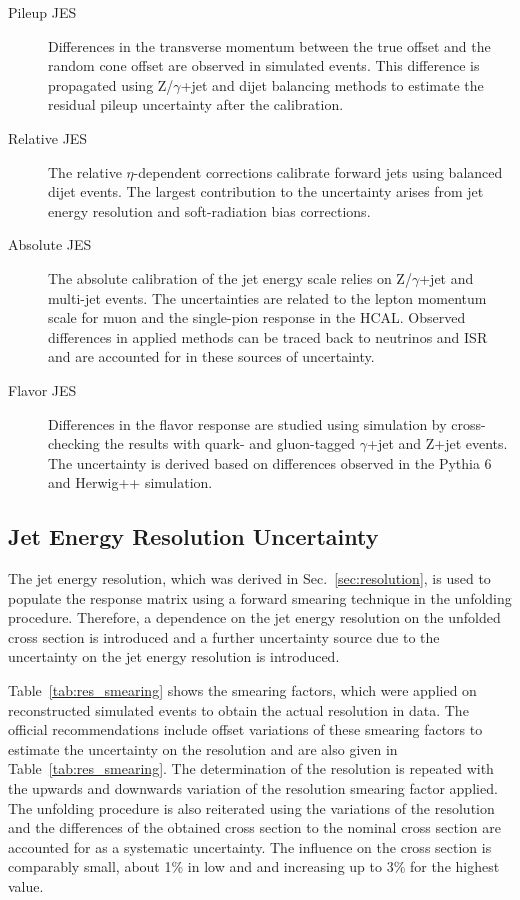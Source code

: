 \begin{description}
    \item[Pileup JES] Differences in the transverse momentum between the true
        offset and the random cone offset are observed in simulated events. This
        difference is propagated using Z/$\gamma$+jet and dijet balancing
        methods to estimate the residual pileup uncertainty after the
        calibration.
    \item[Relative JES] The relative $\eta$-dependent corrections calibrate
        forward jets using balanced dijet events. The largest contribution to
        the uncertainty arises from jet energy resolution and soft-radiation
        bias corrections. 
    \item[Absolute JES]  The absolute calibration of the jet energy scale relies
        on Z/$\gamma$+jet and multi-jet events. The uncertainties are related to
        the lepton momentum scale for muon and the single-pion response in the
        HCAL. Observed differences in applied methods can be traced back to neutrinos
        and ISR and are accounted for in these sources of uncertainty.
    \item[Flavor JES] Differences in the flavor response are studied using
        simulation by cross-checking the results with quark- and gluon-tagged
        $\gamma$+jet and Z+jet events. The uncertainty is derived based on
        differences observed in the Pythia 6 and Herwig++ simulation.
\end{description}

\subsection{Jet Energy Resolution Uncertainty}

The jet energy resolution, which was derived in Sec.~\ref{sec:resolution}, is
used to populate the response matrix using a forward smearing technique in the
unfolding procedure. Therefore, a dependence on the jet energy resolution on the
unfolded cross section is introduced and a further uncertainty source due to the
uncertainty on the jet energy resolution is introduced.

Table~\ref{tab:res_smearing} shows the smearing factors, which were applied on
reconstructed simulated events to obtain the actual resolution in data. The
official recommendations include offset variations of these smearing factors to
estimate the uncertainty on the resolution and are also given in
Table~\ref{tab:res_smearing}. The determination of the resolution is repeated
with the upwards and downwards variation of the resolution smearing factor
applied. The unfolding procedure is also reiterated using the variations of the
resolution and the differences of the obtained cross section to the nominal
cross section are accounted for as a systematic uncertainty. The influence on
the cross section is comparably small, about 1\% in low \ystar and \yboost and increasing
up to 3\% for the highest \ystar value.  

